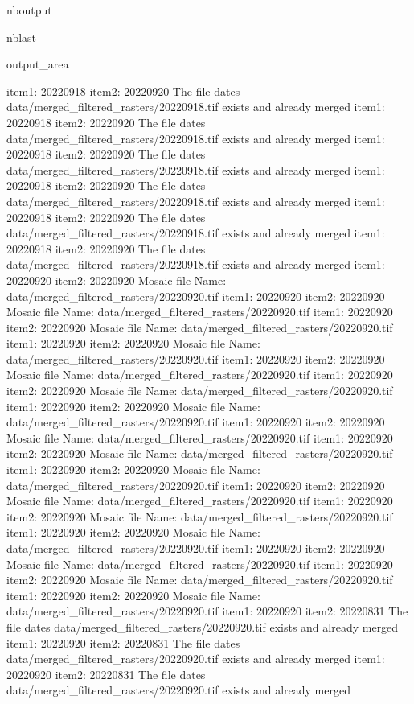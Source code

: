 \documentclass[letterpaper,10pt]{sphinxmanual}
\begin{document}
\begin{sphinxuseclass}{nboutput}
\begin{sphinxuseclass}{nblast}
{\begin{sphinxuseclass}{output_area}
\begin{sphinxuseclass}{}
\begin{sphinxVerbatim}[commandchars=\\\{\}]
item1:  20220918
item2:  20220920
The file dates data/merged\_filtered\_rasters/20220918.tif exists and already merged
item1:  20220918
item2:  20220920
The file dates data/merged\_filtered\_rasters/20220918.tif exists and already merged
item1:  20220918
item2:  20220920
The file dates data/merged\_filtered\_rasters/20220918.tif exists and already merged
item1:  20220918
item2:  20220920
The file dates data/merged\_filtered\_rasters/20220918.tif exists and already merged
item1:  20220918
item2:  20220920
The file dates data/merged\_filtered\_rasters/20220918.tif exists and already merged
item1:  20220918
item2:  20220920
The file dates data/merged\_filtered\_rasters/20220918.tif exists and already merged
item1:  20220920
item2:  20220920
Mosaic file Name:  data/merged\_filtered\_rasters/20220920.tif
item1:  20220920
item2:  20220920
Mosaic file Name:  data/merged\_filtered\_rasters/20220920.tif
item1:  20220920
item2:  20220920
Mosaic file Name:  data/merged\_filtered\_rasters/20220920.tif
item1:  20220920
item2:  20220920
Mosaic file Name:  data/merged\_filtered\_rasters/20220920.tif
item1:  20220920
item2:  20220920
Mosaic file Name:  data/merged\_filtered\_rasters/20220920.tif
item1:  20220920
item2:  20220920
Mosaic file Name:  data/merged\_filtered\_rasters/20220920.tif
item1:  20220920
item2:  20220920
Mosaic file Name:  data/merged\_filtered\_rasters/20220920.tif
item1:  20220920
item2:  20220920
Mosaic file Name:  data/merged\_filtered\_rasters/20220920.tif
item1:  20220920
item2:  20220920
Mosaic file Name:  data/merged\_filtered\_rasters/20220920.tif
item1:  20220920
item2:  20220920
Mosaic file Name:  data/merged\_filtered\_rasters/20220920.tif
item1:  20220920
item2:  20220920
Mosaic file Name:  data/merged\_filtered\_rasters/20220920.tif
item1:  20220920
item2:  20220920
Mosaic file Name:  data/merged\_filtered\_rasters/20220920.tif
item1:  20220920
item2:  20220920
Mosaic file Name:  data/merged\_filtered\_rasters/20220920.tif
item1:  20220920
item2:  20220920
Mosaic file Name:  data/merged\_filtered\_rasters/20220920.tif
item1:  20220920
item2:  20220920
Mosaic file Name:  data/merged\_filtered\_rasters/20220920.tif
item1:  20220920
item2:  20220920
Mosaic file Name:  data/merged\_filtered\_rasters/20220920.tif
item1:  20220920
item2:  20220831
The file dates data/merged\_filtered\_rasters/20220920.tif exists and already merged
item1:  20220920
item2:  20220831
The file dates data/merged\_filtered\_rasters/20220920.tif exists and already merged
item1:  20220920
item2:  20220831
The file dates data/merged\_filtered\_rasters/20220920.tif exists and already merged

\end{sphinxVerbatim}
\end{sphinxuseclass}
\end{sphinxuseclass}}
\end{sphinxuseclass}
\end{sphinxuseclass}
\end{document}
